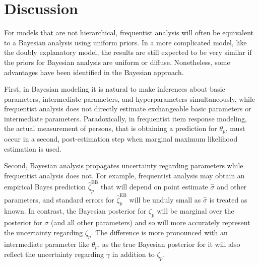\documentclass[12pt, letterpaper]{article}
\begin{document}
\section{Discussion}

For models that are not hierarchical, frequentist analysis will often be equivalent to a Bayesian analysis using uniform priors. In a more complicated model, like the doubly explanatory model, the results are still expected to be very similar if the priors for Bayesian analysis are uniform or diffuse. Nonetheless, some advantages have been identified in the Bayesian approach.

First, in Bayesian modeling it is natural to make inferences about basic parameters, intermediate parameters, and hyperparameters simultaneously, while frequentist analysis does not directly estimate exchangeable basic parameters or intermediate parameters. Paradoxically, in frequentist item response modeling, the actual measurement of persons, that is obtaining a prediction for $\theta_p$, must occur in a second, post-estimation step when marginal maximum likelihood estimation is used.

Second, Bayesian analysis propagates uncertainty regarding parameters while frequentist analysis does not. For example, frequentist analysis may obtain an empirical Bayes prediction $\hat \zeta_p^\mathrm{EB}$ that will depend on point estimate $\hat \sigma$ and other parameters, and standard errors for $\hat \zeta_p^\mathrm{EB}$ will be unduly small as $\hat \sigma$ is treated as known. In contrast, the Bayesian posterior for $\zeta_p$ will be marginal over the posterior for $\sigma$ (and all other parameters) and so will more accurately represent the uncertainty regarding $\zeta_p$. The difference is more pronounced with an intermediate parameter like $\theta_p$, as the true Bayesian posterior for it will also reflect the uncertainty regarding $\gamma$ in addition to $\zeta_p$.


\printbibliography
\end{document}
